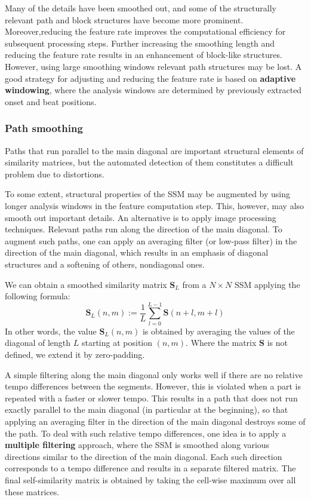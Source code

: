 \documentclass[a4paper, 9pt, twocolumn]{extarticle}
\begin{document}
Many of the details have been smoothed out, and some
of the structurally relevant path and block structures have become more prominent. Moreover,reducing the feature rate improves the computational efficiency for subsequent processing steps. Further increasing the smoothing length and reducing the feature rate results in an enhancement of block-like structures. However, using large smoothing windows relevant path structures may be lost. A good strategy for adjusting and reducing the feature rate is based on \textbf{adaptive windowing}, where the analysis windows are determined by previously extracted onset
and beat positions. 


\subsubsection{Path smoothing}
\label{subsubsection:ssmEnhancementPathSmoothing}


Paths that run parallel to the main diagonal are important structural elements of similarity matrices, but the automated detection of them constitutes a difficult problem due to distortions. 

To some extent, structural properties of the SSM may be augmented by using longer analysis windows in the feature computation step. This, however, may also smooth out important details. An alternative is to apply image processing techniques. Relevant paths run along the direction of the main diagonal. To augment such paths, one can apply an averaging filter (or low-pass filter) in the direction of the main diagonal, which results in an emphasis of diagonal structures and a softening of others, nondiagonal ones.

We can obtain a smoothed similarity matrix $\textbf{S}_{L}$ from a $N \times N$  SSM applying the following formula: 
\[\textbf{S}_{L}(n,m):= \frac{1}{L}\sum_{l=0}^{L-1}\textbf{S}(n+l,m+l)\]
In other words, the value $\textbf{S}_{L}(n,m)$ is obtained by averaging the values of the diagonal of length $L$ starting at position $(n,m)$. Where the matrix $\textbf{S}$ is not defined, we extend it by zero-padding. 

A simple filtering along the main diagonal only works well if there are no relative tempo differences between the segments. However, this is violated when a part is repeated with a faster or slower tempo. This results in a path that does not run exactly parallel to the main diagonal (in particular at the beginning), so that applying an averaging filter in the direction of the main diagonal destroys some of the path. To deal with such relative tempo differences, one idea is to apply a \textbf{multiple filtering} approach, where the SSM is smoothed along various directions similar to the direction of the main diagonal. Each such direction corresponds to a tempo difference and results in a separate filtered matrix. The final self-similarity matrix is obtained by taking the cell-wise maximum over all these matrices.  
\end{document}
